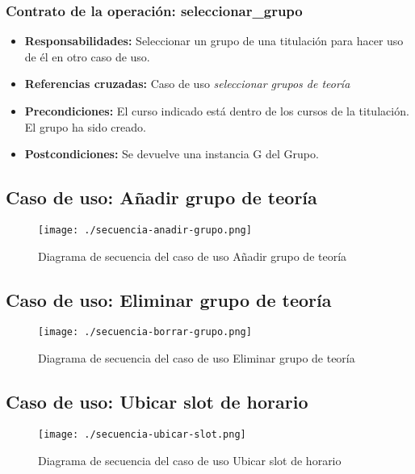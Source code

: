 \subsubsection{Contrato de la operación: seleccionar\_grupo}
\begin{itemize}
\item {\bf Responsabilidades:} Seleccionar un grupo de una titulación para hacer uso de él en otro caso de uso.
\item {\bf Referencias cruzadas:} Caso de uso {\em seleccionar grupos de teoría}
\item {\bf Precondiciones:} El curso indicado está dentro de los cursos de la titulación.
\\El grupo ha sido creado.
\item {\bf Postcondiciones:} Se devuelve una instancia G del Grupo.
\end{itemize}

\subsection{Caso de uso: Añadir grupo de teoría}
\begin{figure}[H] 
  \label{comportamiento-anadir-grupos} 
	\begin{center}
    \texttt{[image: ./secuencia-anadir-grupo.png]}
  \end{center}
\caption{Diagrama de secuencia del caso de uso Añadir grupo de teoría}
\end{figure}

\subsection{Caso de uso: Eliminar grupo de teoría}
\begin{figure}[H] 
  \label{comportamiento-borrar-grupos} 
	\begin{center}
    \texttt{[image: ./secuencia-borrar-grupo.png]}
  \end{center}
\caption{Diagrama de secuencia del caso de uso Eliminar grupo de teoría}
\end{figure}

\subsection{Caso de uso: Ubicar slot de horario}
\begin{figure}[H] 
  \label{comportamiento-ubicar-slot} 
	\begin{center}
    \texttt{[image: ./secuencia-ubicar-slot.png]}
  \end{center}
\caption{Diagrama de secuencia del caso de uso Ubicar slot de horario}
\end{figure}

